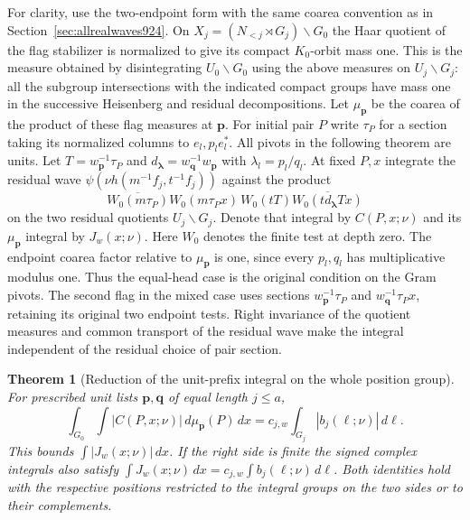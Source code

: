 \documentclass[a4paper,11pt]{article}
\newtheorem{theorem}[proposition]{Theorem}
\theoremstyle{definition}
\theoremstyle{remark}
\numberwithin{equation}{section}
\begin{document}
For clarity, use the two-endpoint form with the same coarea
convention as in Section~\ref{sec:allrealwaves924}. On
\(X_j=(N_{<j}\rtimes G_j)\backslash G_0\) the Haar quotient
of the flag stabilizer is normalized to give its compact
\(K_0\)-orbit mass one. This is the measure obtained by
disintegrating \(U_0\backslash G_0\) using the above measures
on \(U_j\backslash G_j\): all the subgroup intersections with
the indicated compact groups have mass one in the successive
Heisenberg and residual decompositions. Let
\(\mu_{\mathbf p}\) be the coarea of the product of these flag
measures at \(\mathbf p\). For initial pair \(P\) write
\(\tau_P\) for a section taking its normalized columns to
\(e_l,p_l e_l^*\). All pivots in the following theorem are
units. Let \(T=w_{\mathbf p}^{-1}\tau_P\) and
\(d_{\boldsymbol\lambda}=w_{\mathbf q}^{-1}w_{\mathbf p}\) with
\(\lambda_l=p_l/q_l\). At fixed \(P,x\) integrate the residual
wave \(\psi(\nu h(m^{-1}f_j,t^{-1}f_j))\) against the product
\[
 \overline{W_0(m\tau_P)}W_0(m\tau_Px)\,
                W_0(tT)\overline{W_0(t d_{\boldsymbol\lambda}Tx)}
\]
on the two residual quotients \(U_j\backslash G_j\).
Denote that integral by \(C(P,x;\nu)\) and its \(\mu_{\mathbf p}\)
integral by \(J_w(x;\nu)\). Here \(W_0\) denotes the finite
test at depth zero. The endpoint coarea factor relative to
\(\mu_{\mathbf p}\) is one, since every \(p_l,q_l\) has
multiplicative modulus one. Thus the equal-head case is the
original condition on the Gram pivots. The second flag in
the mixed case uses sections \(w_{\mathbf p}^{-1}\tau_P\)
and \(w_{\mathbf q}^{-1}\tau_Px\), retaining its original
two endpoint tests. Right invariance of the quotient measures
and common transport of the residual wave make the integral
independent of the residual choice of pair section.

\begin{theorem}[Reduction of the unit-prefix integral on the whole position group]
\leavevmode\label{thm:finiteunitreduce930}
For prescribed unit lists \(\mathbf p,\mathbf q\) of equal
length \(j\le a\),
\[
 \int_{G_0}\int |C(P,x;\nu)|\,d\mu_{\mathbf p}(P)\,dx
       =c_{j,w}\int_{G_j}|b_j(\ell;\nu)|\,d\ell .
\]
This bounds \(\int|J_w(x;\nu)|\,dx\). If the right side is
finite the signed complex integrals also satisfy
\(\int J_w(x;\nu)\,dx=c_{j,w}\int b_j(\ell;\nu)\,d\ell\).
Both identities hold with the respective positions restricted
to the integral groups on the two sides or to their complements.
\end{theorem}
\end{document}
